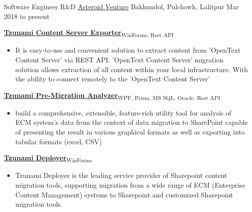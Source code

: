 

\begin{cventries}
\cventry
{Software Engineer R\&D} %
{\href{https://asteroidventure.com/}{Asteroid Venture}} %
{Bakhundol, Pulchowk, Lalitpur} %
{Mar 2018 to present} %
{
\begin{cvitems} %
		\item {\textbf{\href{https://tzunami.com/opentext-content-server/}{Tzunami Content Server Exporter}}\textsubscript{WinForms, Rest API}}
		\begin{itemize}
			\item {It is easy-to-use and convenient solution to extract content from 'OpenText Content Server' via REST API. 'OpenText Content Server' migration solution allows extraction of all content within your local infrastructure. With the ability to connect remotely to the 'OpenText Content Server'}
		\end{itemize}
		\item {\textbf{\href{https://tzunami.com/pre-migration-analysis/}{Tzunami Pre-Migration Analyzer}}\textsubscript{WPF, Prism, MS SQL, Oracle, Rest API}}
		\begin{itemize}
			\item {build a comprehensive, extensible, feature-rich utility tool for analysis of ECM system's data from the context of data migration to SharePoint capable of presenting the result in various graphical formats as well as exporting into tabular formats (excel, CSV)}
		\end{itemize}
		\item {\textbf{\href{https://tzunami.com/}{Tzunami Deployer}}\textsubscript{WinForms}}
		\begin{itemize}
			\item {Tzunami Deployer is the leading service provider of Sharepoint content migration tools, supporting migration from a wide range of ECM (Enterprise Content Management) systems to Sharepoint and customized Sharepoint migration tools.}
		\end{itemize}

\end{cvitems}}
\end{cventries}
